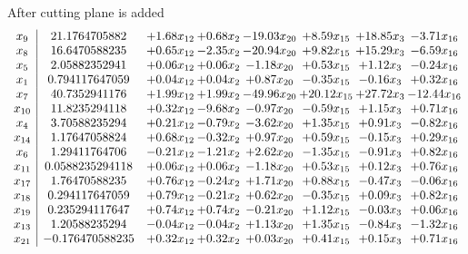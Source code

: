 \documentclass[8pt]{article}
\begin{document}
 After cutting plane is added 
\[\begin{array}{c| c c@{\hskip 2pt} c@{\hskip 2pt} c@{\hskip 2pt} c@{\hskip 2pt} c@{\hskip 2pt} c@{\hskip 2pt} }
 x_{9}   &  21.1764705882 & +  1.68 x_{12} & +  0.68 x_{2} & -19.03 x_{20} & +  8.59 x_{15} & + 18.85 x_{3} & -3.71 x_{16}\\
 x_{8}   &  16.6470588235 & +  0.65 x_{12} & -2.35 x_{2} & -20.94 x_{20} & +  9.82 x_{15} & + 15.29 x_{3} & -6.59 x_{16}\\
 x_{5}   &  2.05882352941 & +  0.06 x_{12} & +  0.06 x_{2} & -1.18 x_{20} & +  0.53 x_{15} & +  1.12 x_{3} & -0.24 x_{16}\\
 x_{1}   &  0.794117647059 & +  0.04 x_{12} & +  0.04 x_{2} & +  0.87 x_{20} & -0.35 x_{15} & -0.16 x_{3} & +  0.32 x_{16}\\
 x_{7}   &  40.7352941176 & +  1.99 x_{12} & +  1.99 x_{2} & -49.96 x_{20} & + 20.12 x_{15} & + 27.72 x_{3} & -12.44 x_{16}\\
 x_{10}   &  11.8235294118 & +  0.32 x_{12} & -9.68 x_{2} & -0.97 x_{20} & -0.59 x_{15} & +  1.15 x_{3} & +  0.71 x_{16}\\
 x_{4}   &  3.70588235294 & +  0.21 x_{12} & -0.79 x_{2} & -3.62 x_{20} & +  1.35 x_{15} & +  0.91 x_{3} & -0.82 x_{16}\\
 x_{14}   &  1.17647058824 & +  0.68 x_{12} & -0.32 x_{2} & +  0.97 x_{20} & +  0.59 x_{15} & -0.15 x_{3} & +  0.29 x_{16}\\
 x_{6}   &  1.29411764706 & -0.21 x_{12} & -1.21 x_{2} & +  2.62 x_{20} & -1.35 x_{15} & -0.91 x_{3} & +  0.82 x_{16}\\
 x_{11}   &  0.0588235294118 & +  0.06 x_{12} & +  0.06 x_{2} & -1.18 x_{20} & +  0.53 x_{15} & +  0.12 x_{3} & +  0.76 x_{16}\\
 x_{17}   &  1.76470588235 & +  0.76 x_{12} & -0.24 x_{2} & +  1.71 x_{20} & +  0.88 x_{15} & -0.47 x_{3} & -0.06 x_{16}\\
 x_{18}   &  0.294117647059 & +  0.79 x_{12} & -0.21 x_{2} & +  0.62 x_{20} & -0.35 x_{15} & +  0.09 x_{3} & +  0.82 x_{16}\\
 x_{19}   &  0.235294117647 & +  0.74 x_{12} & +  0.74 x_{2} & -0.21 x_{20} & +  1.12 x_{15} & -0.03 x_{3} & +  0.06 x_{16}\\
 x_{13}   &  1.20588235294 & -0.04 x_{12} & -0.04 x_{2} & +  1.13 x_{20} & +  1.35 x_{15} & -0.84 x_{3} & -1.32 x_{16}\\
 x_{21}   &  -0.176470588235 & +  0.32 x_{12} & +  0.32 x_{2} & +  0.03 x_{20} & +  0.41 x_{15} & +  0.15 x_{3} & +  0.71 x_{16}\\

\end{array}\]
\end{document}
